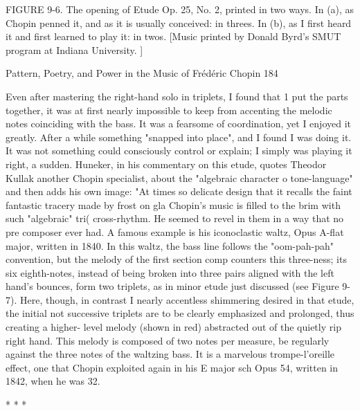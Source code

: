 FIGURE 9-6. The opening of Etude Op. 25, No. 2, printed in two ways. In (a), as Chopin
penned it, and as it is usually conceived: in threes. In (b), as I first heard it and first
learned to play it: in twos. [Music printed by Donald Byrd's SMUT program at Indiana
University. ]




Pattern, Poetry, and Power in the Music of Frédéric Chopin                             184

        Even after mastering the right-hand solo in triplets, I found that 1 put the parts
together, it was at first nearly impossible to keep from accenting the melodic notes
coinciding with the bass. It was a fearsome of coordination, yet I enjoyed it greatly. After
a while something "snapped into place", and I found I was doing it. It was not something
could consciously control or explain; I simply was playing it right, a sudden. Huneker, in
his commentary on this etude, quotes Theodor Kullak another Chopin specialist, about
the "algebraic character o tone-language" and then adds his own image: "At times so
delicate design that it recalls the faint fantastic tracery made by frost on gla
        Chopin's music is filled to the brim with such "algebraic" tri( cross-rhythm. He
seemed to revel in them in a way that no pre composer ever had. A famous example is his
iconoclastic waltz, Opus A-flat major, written in 1840. In this waltz, the bass line follows
the "oom-pah-pah" convention, but the melody of the first section comp counters this
three-ness; its six eighth-notes, instead of being broken into three pairs aligned with the
left hand's bounces, form two triplets, as in minor etude just discussed (see Figure 9-7).
Here, though, in contrast I nearly accentless shimmering desired in that etude, the initial
not successive triplets are to be clearly emphasized and prolonged, thus creating a higher-
level melody (shown in red) abstracted out of the quietly rip right hand. This melody is
composed of two notes per measure, be regularly against the three notes of the waltzing
bass. It is a marvelous trompe-l'oreille effect, one that Chopin exploited again in his E
major sch Opus 54, written in 1842, when he was 32.

                                       *     *     *


